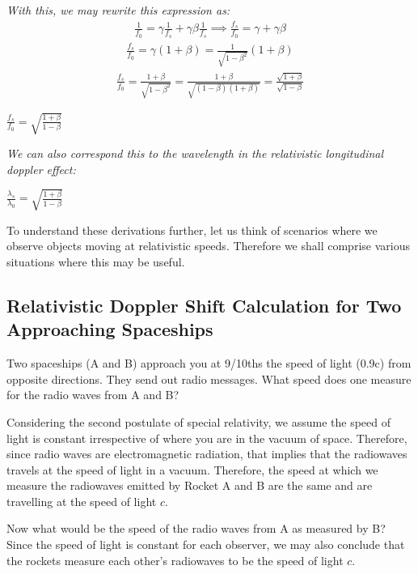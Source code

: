\documentclass{article}
\begin{document}
\textit{With this, we may rewrite this expression as:}
\begin{gather*}
\frac{1}{f_0} = \gamma\frac{1}{f_s} + \gamma\beta\frac{1}{f_s} \implies \frac{f_s}{f_0} = \gamma + \gamma\beta
\end{gather*}
\begin{gather*}
\frac{f_s}{f_0} = \gamma(1+\beta) = \frac{1}{\sqrt{1-\beta^2}}(1+\beta)
\end{gather*}
\begin{gather*}
	\frac{f_s}{f_0} = \frac{1+\beta}{\sqrt{1-\beta^2}} = \frac{1+\beta}{\sqrt{(1-\beta)(1+\beta)}} = \frac{\sqrt{1+\beta}}{\sqrt{1-\beta}}
\end{gather*}
\begin{center}
	$\boxed{\frac{f_s}{f_0} = \sqrt{\frac{1+\beta}{1-\beta}}}
	$
\end{center}
\textit{We can also correspond this to the wavelength in the relativistic longitudinal doppler effect: }
\begin{center}
	$\boxed{\frac{\lambda_s}{\lambda_0} = \sqrt{\frac{1+\beta}{1-\beta}}}
$
\end{center}

To understand these derivations further, let us think of scenarios where we observe objects moving at relativistic speeds. Therefore we shall comprise various situations where this may be useful.

\subsection{Relativistic Doppler Shift Calculation for Two Approaching Spaceships}

Two spaceships (A and B) approach you at 9/10ths the speed of light (0.9c) from opposite directions. They send out radio messages. What speed does one measure for the radio waves from A and B? 


Considering the second postulate of special relativity, we assume the speed of light is constant irrespective of where you are in the vacuum of space. Therefore, since radio waves are electromagnetic radiation, that implies that the radiowaves travels at the speed of light in a vacuum. Therefore, the speed at which we measure the radiowaves emitted by Rocket A and B are the same and are travelling at the speed of light $c$. 


Now what would be the speed of the radio waves from A as measured by B? Since the speed of light is constant for each observer, we may also conclude that the rockets measure each other's radiowaves to be the speed of light $c$.
\end{document}
